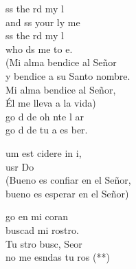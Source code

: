 \documentclass[12pt]{article}
\begin{document}
\begin{multicols*}{2}
\begin{cancion}%
	ss the rd my l\\
	and ss your ly me\\
	ss the rd my l\\
	who ds me to e.\\
(Mi alma bendice al Señor\\
y bendice a su Santo nombre.\\
Mi alma bendice al Señor,\\
Él me lleva a la vida)\\
	go d de  oh nte l ar\\
	go d de  tu a es ber.\\
\end{cancion}%

\begin{cancion}%
	um est cidere in i,\\
	usr Do\\
(Bueno es confiar en el Señor,\\
 bueno es esperar en el Señor)\\
\end{cancion}%

\begin{cancion}%
	go en mi coran \\
buscad mi rostro.\\
	Tu stro busc, Seor \\
	no me esndas tu ros (**)\\
\end{cancion}%


\end{multicols*}
\end{document}
